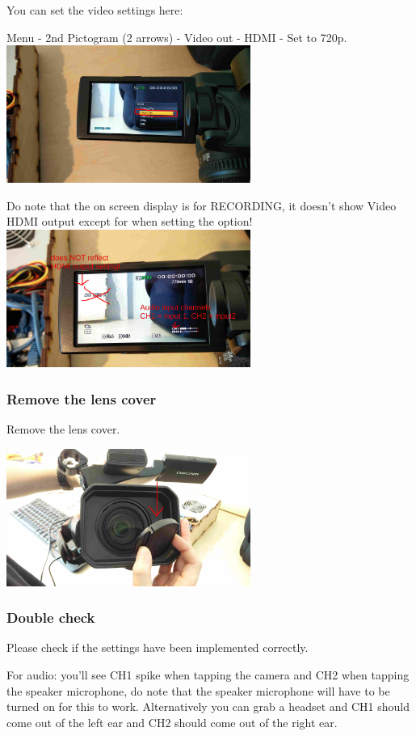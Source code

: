 \documentclass{article}
\begin{document}
You can set the video settings here:

Menu - 2nd Pictogram (2 arrows) - Video out - HDMI - Set to 720p.
\includegraphics[width = 80mm]{Sony05.jpg}

Do note that the on screen display is for RECORDING, it doesn't show Video HDMI output except for when setting the option!
\includegraphics[width = 80mm]{Sony06.jpg}

\subsubsection{Remove the lens cover}
Remove the lens cover.

\includegraphics[width = 80mm]{Sony07.jpg}

\subsubsection{Double check}
Please check if the settings have been implemented correctly. 

For audio: you'll see CH1 spike when tapping the camera and CH2 when tapping the speaker microphone, do note that the speaker microphone will have to be turned on for this to work. Alternatively you can grab a headset and CH1 should come out of the left ear and CH2 should come out of the right ear.
\end{document}
